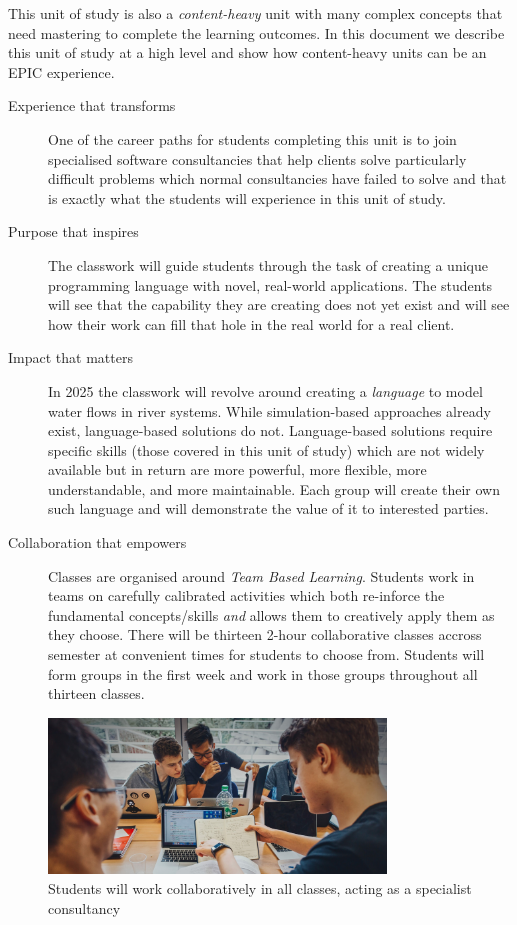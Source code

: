 \documentclass[twoside=false,DIV=14]{scrartcl}
\begin{document}
This unit of study is also a \emph{content-heavy} unit with many complex concepts that need mastering to complete the learning outcomes.  In this document we describe this unit of study at a high level and show how content-heavy units can be an EPIC experience.

\begin{description}
\item[Experience that transforms] One of the career paths for students completing this unit is to join specialised software consultancies that help clients solve particularly difficult problems which normal consultancies have failed to solve and that is exactly what the students will experience in this unit of study.
\item[Purpose that inspires] The classwork will guide students through the task of creating a unique programming language with novel, real-world applications.  The students will see that the capability they are creating does not yet exist and will see how their work can fill that hole in the real world for a real client.  
\item[Impact that matters] In 2025 the classwork will revolve around creating a \emph{language} to model water flows in river systems.  While simulation-based approaches already exist, language-based solutions do not.  Language-based solutions require specific skills (those covered in this unit of study) which are not widely available but in return are more powerful, more flexible, more understandable, and more maintainable.  Each group will create their own such language and will demonstrate the value of it to interested parties.
\item[Collaboration that empowers] Classes are organised around \emph{Team Based Learning}.  Students work in teams on carefully calibrated activities which both re-inforce the fundamental concepts/skills \emph{and} allows them to creatively apply them as they choose.  There will be thirteen 2-hour collaborative classes accross semester at convenient times for students to choose from.  Students will form groups in the first week and work in those groups throughout all thirteen classes.
\end{description}

\begin{figure}[h]
    \begin{center}
    \includegraphics[width=0.8\textwidth]{tbl.jpg}
\end{center}
\caption{Students will work collaboratively in all classes, acting as a specialist consultancy}
\end{figure}
\end{document}
